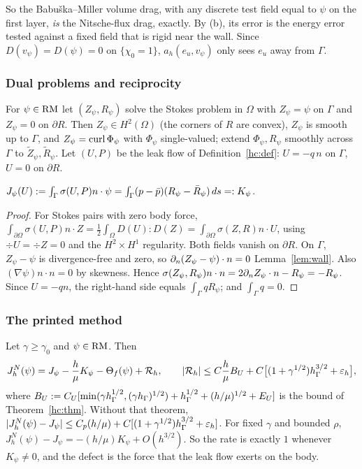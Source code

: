 So the Babu\v{s}ka--Miller volume drag, with any discrete test field equal to $\psi$ on the first layer, \emph{is} the Nitsche-flux drag, exactly. By (b), its error is the energy error tested against a fixed field that is rigid near the wall. Since $D(v_\psi)=D(\psi)=0$ on $\{\chi_0=1\}$, $a_h(e_u,v_\psi)$ only sees $e_u$ away from $\Gamma$.

\subsubsection{Dual problems and reciprocity}
For $\psi\in\mathrm{RM}$ let $(Z_\psi,R_\psi)$ solve the Stokes problem in $\Omega$ with $Z_\psi=\psi$ on $\Gamma$ and $Z_\psi=0$ on $\partial R$. Then $Z_\psi\in H^2(\Omega)$ (the corners of $R$ are convex), $Z_\psi$ is smooth up to $\Gamma$, and $Z_\psi=\operatorname{curl}\Phi_\psi$ with $\Phi_\psi$ single-valued; extend $\Phi_\psi,R_\psi$ smoothly across $\Gamma$ to $\tilde Z_\psi,\tilde R_\psi$. Let $(U,P)$ be the leak flow of Definition~\ref{hc:def}: $U=-q\,n$ on $\Gamma$, $U=0$ on $\partial R$.

\begin{lemma}[Reciprocity]\label{pd:lem:recip}
$J_\psi(U):=\int_\Gamma\sigma(U,P)n\cdot\psi=\int_\Gamma(p-\bar p)(R_\psi-\bar R_\psi)\,ds=:K_\psi$.
\end{lemma}

\begin{proof}
For Stokes pairs with zero body force, $\int_{\partial\Omega}\sigma(U,P)n\cdot Z=\frac12\int_\Omega D(U):D(Z)=\int_{\partial\Omega}\sigma(Z,R)n\cdot U$, using $\div U=\div Z=0$ and the $H^2\times H^1$ regularity. Both fields vanish on $\partial R$. On $\Gamma$, $Z_\psi-\psi$ is divergence-free and zero, so $\partial_n(Z_\psi-\psi)\cdot n=0$ Lemma~\ref{lem:wall}. Also $(\nabla\psi)n\cdot n=0$ by skewness. Hence $\sigma(Z_\psi,R_\psi)n\cdot n=2\partial_n Z_\psi\cdot n-R_\psi=-R_\psi$. Since $U=-qn$, the right-hand side equals $\int_\Gamma qR_\psi$; and $\int_\Gamma q=0$.
\end{proof}

\subsubsection{The printed method}

\begin{theorem}\label{pd:thm:gsdrag}
Let $\gamma\ge\gamma_0$ and $\psi\in\mathrm{RM}$. Then
\[
J^N_h(\psi)=J_\psi-\frac h\mu K_\psi-\Theta_f(\psi)+\mathcal R_h,\qquad
|\mathcal R_h|\le C\frac h\mu B_U+C\bigl[(1+\gamma^{1/2})h_\Gamma^{3/2}+\varepsilon_h\bigr],
\]
where $B_U:=C_U[\min(\gamma h_\Gamma^{1/2},(\gamma h_\Gamma)^{1/2})+h_\Gamma^{1/2}+(h/\mu)^{1/2}+E_U]$ is the bound of Theorem~\ref{hc:thm}. Without that theorem, $|J^N_h(\psi)-J_\psi|\le C_p(h/\mu)+C[(1+\gamma^{1/2})h_\Gamma^{3/2}+\varepsilon_h]$. For fixed $\gamma$ and bounded $\rho$, $J^N_h(\psi)-J_\psi=-(h/\mu)K_\psi+O(h^{3/2})$. So the rate is exactly $1$ whenever $K_\psi\ne0$, and the defect is the force that the leak flow exerts on the body.
\end{theorem}

